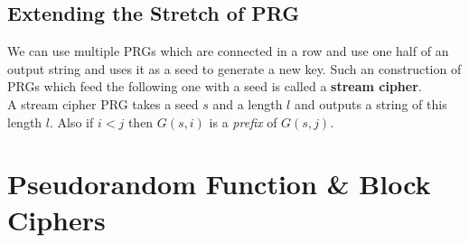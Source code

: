 \documentclass{article}
\begin{document}
\begin{adjustwidth}{2em}{2em}
			\subsection{Extending the Stretch of PRG}
			\begin{adjustwidth}{2em}{2em}
				We can use multiple PRGs which are connected in a row and use one half of an output string and uses it as a seed to generate a new key. Such an construction of PRGs which feed the following one with a seed is called a \textbf{stream cipher}. \\
				A stream cipher PRG takes a seed $s$ and a length $l$ and outputs a string of this length $l$. Also if $i < j$ then $G(s,i)$ is a \textit{prefix} of $G(s,j)$.
			\end{adjustwidth}
		\end{adjustwidth}
		\newpage
		\section{Pseudorandom Function \& Block Ciphers}
\end{document}
